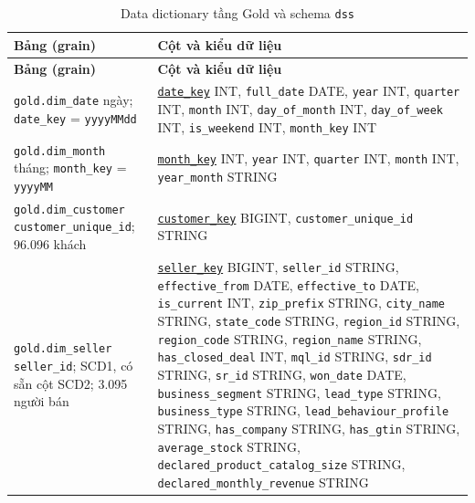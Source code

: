 \documentclass[a4paper]{article}
\begin{document}
{\footnotesize
\setlength{\tabcolsep}{3pt}
\renewcommand{\arraystretch}{1.12}
\begin{longtable}{@{}>{\raggedright\arraybackslash}p{3.6cm}>{\raggedright\arraybackslash}p{12.6cm}@{}}
\caption{Data dictionary tầng Gold và schema \texttt{dss}}\label{tab:pl_dd}\\
\toprule
\textbf{Bảng (grain)} & \textbf{Cột và kiểu dữ liệu} \\
\midrule
\endfirsthead
\toprule
\textbf{Bảng (grain)} & \textbf{Cột và kiểu dữ liệu} \\
\midrule
\endhead
\bottomrule
\endfoot
\texttt{gold.dim\_\allowbreak{}date} \newline 1 ngày; \texttt{date\_\allowbreak{}key} = \texttt{yyyyMMdd} & \underline{\texttt{date\_\allowbreak{}key}} INT, \texttt{full\_\allowbreak{}date} DATE, \texttt{year} INT, \texttt{quarter} INT, \texttt{month} INT, \texttt{day\_\allowbreak{}of\_\allowbreak{}month} INT, \texttt{day\_\allowbreak{}of\_\allowbreak{}week} INT, \texttt{is\_\allowbreak{}weekend} INT, \texttt{month\_\allowbreak{}key} INT \\
\addlinespace
\texttt{gold.dim\_\allowbreak{}month} \newline 1 tháng; \texttt{month\_\allowbreak{}key} = \texttt{yyyyMM} & \underline{\texttt{month\_\allowbreak{}key}} INT, \texttt{year} INT, \texttt{quarter} INT, \texttt{month} INT, \texttt{year\_\allowbreak{}month} STRING \\
\addlinespace
\texttt{gold.dim\_\allowbreak{}customer} \newline 1 \texttt{customer\_\allowbreak{}unique\_\allowbreak{}id}; 96.096 khách & \underline{\texttt{customer\_\allowbreak{}key}} BIGINT, \texttt{customer\_\allowbreak{}unique\_\allowbreak{}id} STRING \\
\addlinespace
\texttt{gold.dim\_\allowbreak{}seller} \newline 1 \texttt{seller\_\allowbreak{}id}; SCD1, có sẵn cột SCD2; 3.095 người bán & \underline{\texttt{seller\_\allowbreak{}key}} BIGINT, \texttt{seller\_\allowbreak{}id} STRING, \texttt{effective\_\allowbreak{}from} DATE, \texttt{effective\_\allowbreak{}to} DATE, \texttt{is\_\allowbreak{}current} INT, \texttt{zip\_\allowbreak{}prefix} STRING, \texttt{city\_\allowbreak{}name} STRING, \texttt{state\_\allowbreak{}code} STRING, \texttt{region\_\allowbreak{}id} STRING, \texttt{region\_\allowbreak{}code} STRING, \texttt{region\_\allowbreak{}name} STRING, \texttt{has\_\allowbreak{}closed\_\allowbreak{}deal} INT, \texttt{mql\_\allowbreak{}id} STRING, \texttt{sdr\_\allowbreak{}id} STRING, \texttt{sr\_\allowbreak{}id} STRING, \texttt{won\_\allowbreak{}date} DATE, \texttt{business\_\allowbreak{}segment} STRING, \texttt{lead\_\allowbreak{}type} STRING, \texttt{business\_\allowbreak{}type} STRING, \texttt{lead\_\allowbreak{}behaviour\_\allowbreak{}profile} STRING, \texttt{has\_\allowbreak{}company} STRING, \texttt{has\_\allowbreak{}gtin} STRING, \texttt{average\_\allowbreak{}stock} STRING, \texttt{declared\_\allowbreak{}product\_\allowbreak{}catalog\_\allowbreak{}size} STRING, \texttt{declared\_\allowbreak{}monthly\_\allowbreak{}revenue} STRING \\

\end{longtable}}
\end{document}
